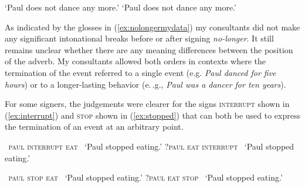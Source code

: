 %
\begin{exe}
\ex\label{ex:nolongermydata}\begin{xlist} 
\ex {}  
\glt `Paul does not dance any more.' \label{ex:nolongermydataa}
\ex {} 
\glt `Paul does not dance any more.' \label{ex:nolongermydatab}
\end{xlist}
\end{exe}

\noindent As indicated by the glosses in (\ref{ex:nolongermydata}) my consultants did not make any significant intonational breaks before or after signing \textit{no-longer}. It still remains unclear whether there are any meaning differences between the position of the adverb. My consultants allowed both orders in contexts where the termination of the event referred to a single event (e.g. \textit{Paul danced for five hours}) or to a longer-lasting behavior (e.\,.g., \textit{Paul was a dancer for ten years}). 

For some signers, the judgements were clearer for the signs \textsc{interrupt} shown in (\ref{ex:interrupt}) and \textsc{stop} shown in (\ref{ex:stopped}) that can both be used to express the termination of an event at an arbitrary point. 

\begin{exe}
\ex\label{ex:interrupt}\begin{xlist} 
\ex
{\textcolor{white}{?}\textsc{paul interrupt eat}}      
\glt \textcolor{white}{?}`Paul stopped eating.' \label{ex:interrupta}
\ex
{?\textsc{paul eat interrupt}}       
\glt \textcolor{white}{?}`Paul stopped eating.' \label{ex:interruptb}
\end{xlist}
\end{exe}

\begin{exe}
\ex\label{ex:stopped}\begin{xlist} 
\ex
{\textcolor{white}{?}\textsc{paul stop eat}}      
\glt \textcolor{white}{*}`Paul stopped eating.' \label{ex:stoppeda}
\ex
{?\textsc{paul eat stop}}       
\glt \textcolor{white}{?}`Paul stopped eating.' \label{ex:stoppedb}
\end{xlist}
\end{exe}

